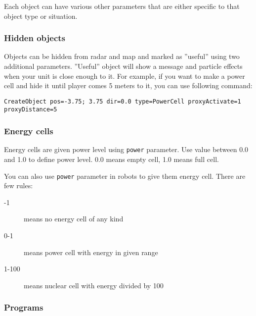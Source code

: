 Each object can have various other parameters that are either specific to that object type or situation.


\subsubsection{Hidden objects}

Objects can be hidden from radar and map and marked as ''useful'' using two additional parameters. ''Useful'' object will show a message and particle effects when your unit is close enough to it. For example, if you want to make a power cell and hide it until player comes 5 meters to it, you can use following command:

\begin{lstlisting}[style=scene]
CreateObject pos=-3.75; 3.75 dir=0.0 type=PowerCell proxyActivate=1 proxyDistance=5
\end{lstlisting}



\subsubsection{Energy cells}

Energy cells are given power level using \texttt{power} parameter. Use value between 0.0 and 1.0 to define power level. 0.0 means empty cell, 1.0 means full cell.

You can also use \texttt{power} parameter in robots to give them energy cell. There are few rules:

\begin{description}
    \item[-1] means no energy cell of any kind
    \item[0-1] means power cell with energy in given range
    \item[1-100] means nuclear cell with energy divided by 100
\end{description}


\subsubsection{Programs}

